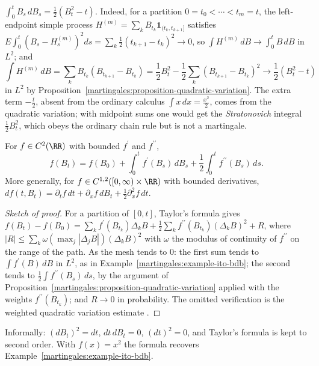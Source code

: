 \begin{example}\label{martingales:example-ito-bdb}
$\int_0^tB_s\,dB_s = \frac12(B_t^2 - t)$. Indeed, for a partition $0 = t_0 < \cdots < t_m = t$, the left-endpoint simple process $H^{(m)} = \sum_kB_{t_k}\mathbf{1}_{(t_k, t_{k+1}]}$ satisfies
$E\int_0^t(B_s - H^{(m)}_s)^2ds = \sum_k\frac12(t_{k+1} - t_k)^2 \to 0$, so $\int H^{(m)}\,dB \to \int_0^tB\,dB$ in $L^2$; and
\[
\int H^{(m)}\,dB = \sum_kB_{t_k}(B_{t_{k+1}} - B_{t_k}) = \frac12B_t^2 - \frac12\sum_k(B_{t_{k+1}} - B_{t_k})^2 \to \frac12(B_t^2 - t)
\]
in $L^2$ by Proposition~\ref{martingales:proposition-quadratic-variation}. The extra term $-\frac t2$, absent from the ordinary calculus $\int x\,dx = \frac{x^2}{2}$, comes from the quadratic variation; with midpoint sums one would get
the \emph{Stratonovich} integral $\frac12B_t^2$, which obeys the ordinary chain rule but is not a martingale.
\end{example}

\begin{theorem}[It\^o's formula]\label{martingales:theorem-ito-formula}
For $f \in C^2(\RR)$ with bounded $f^{\prime}$ and $f^{\prime\prime}$,
\[
f(B_t) = f(B_0) + \int_0^tf^{\prime}(B_s)\,dB_s + \frac12\int_0^tf^{\prime\prime}(B_s)\,ds.
\]
More generally, for $f \in C^{1,2}([0, \infty) \times \RR)$ with bounded derivatives, $df(t, B_t) = \partial_tf\,dt + \partial_xf\,dB_t + \frac12\partial_x^2f\,dt$.
\end{theorem}

\begin{proof}[Sketch of proof]
For a partition of $[0, t]$, Taylor's formula gives $f(B_t) - f(B_0) = \sum_kf^{\prime}(B_{t_k})\Delta_kB + \frac12\sum_kf^{\prime\prime}(B_{t_k})(\Delta_kB)^2 + R$, where $|R| \leq \sum_k\omega(\max_j|\Delta_jB|)(\Delta_kB)^2$ with $\omega$ the modulus
of continuity of $f^{\prime\prime}$ on the range of the path. As the mesh tends to $0$: the first sum tends to $\int f^{\prime}(B)\,dB$ in $L^2$, as in Example~\ref{martingales:example-ito-bdb}; the second tends to $\frac12\int f^{\prime\prime}(B_s)\,ds$,
by the argument of Proposition~\ref{martingales:proposition-quadratic-variation} applied with the weights $f^{\prime\prime}(B_{t_k})$; and $R \to 0$ in probability. The omitted verification is the weighted quadratic variation estimate
\cite{karatzas-shreve}.
\end{proof}

Informally: $(dB_t)^2 = dt$, $dt\,dB_t = 0$, $(dt)^2 = 0$, and Taylor's formula is kept to second order. With $f(x) = x^2$ the formula recovers Example~\ref{martingales:example-ito-bdb}.

